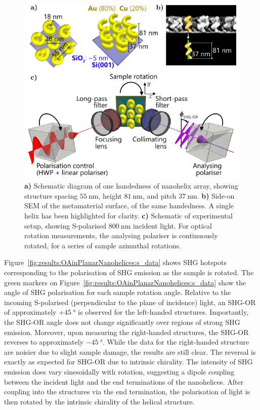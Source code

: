 \begin{figure}[htb!]	
    \centering	
    \includegraphics[scale=1.0]{./figures/results/OAinPlanarNanohelices/setup.pdf}
    \caption{\label{fig:results:OAinPlanarNanohelices:setup}
    \textbf{a)} Schematic diagram of one handedness of nanohelix array, showing structure spacing $\SI{55}{\nano\m}$, height $\SI{81}{\nano\m}$, and pitch $\SI{37}{\nano\m}$. \textbf{b)} Side-on SEM of the metamaterial surface, of the same handedness. A single helix has been highlighted for clarity. \textbf{c)} Schematic of experimental setup, showing S-polarised $\SI{800}{\nano\m}$ incident light. For optical rotation measurements, the analysing polariser is continuously rotated, for a series of sample azimuthal rotations.}	
\end{figure}

Figure~\ref{fig:results:OAinPlanarNanohelices:s_data} shows SHG hotspots corresponding to the polarisation of SHG emission as the sample is rotated. The green markers on Figure~\ref{fig:results:OAinPlanarNanohelices:s_data} show the angle of SHG polarisation for each sample rotation angle. Relative to the incoming S-polarised (perpendicular to the plane of incidence) light, an SHG-OR of approximately $+\SI{45}{\degree}$ is observed for the left-handed structures. Importantly, the SHG-OR angle does not change significantly over regions of strong SHG emission.
Moreover, upon measuring the right-handed structures, the SHG-OR reverses to approximately $-\SI{45}{\degree}$. While the data for the right-handed structure are noisier due to slight sample damage, the results are still clear. The reversal is exactly as expected for SHG-OR due to intrinsic chirality. The intensity of SHG emission does vary sinesoidally with rotation, suggesting a dipole coupling between the incident light and the end terminations of the nanohelices. After coupling into the structures via the end termination, the polarisation of light is then rotated by the intrinsic chirality of the helical structure.


